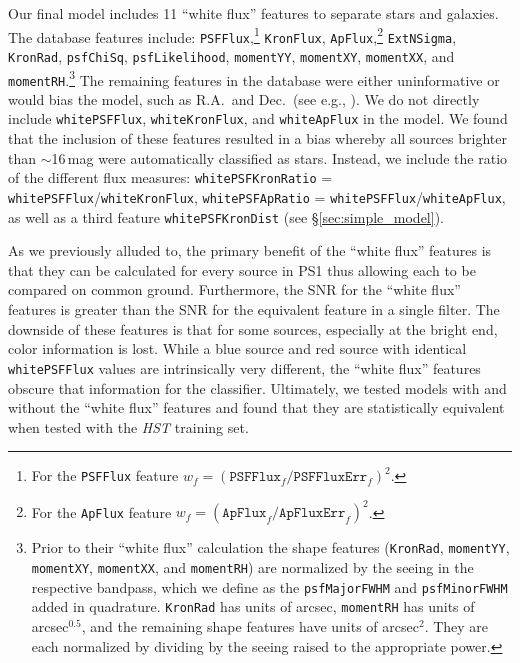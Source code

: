\documentclass[twocolumn]{aastex62}
\begin{document}
Our final model includes 11 ``white flux'' features to separate stars and
galaxies. The database features include: \texttt{PSFFlux},\footnote{For the
\texttt{PSFFlux} feature $w_f =
(\mathtt{PSFFlux}_f/\mathtt{PSFFluxErr}_f)^2$.} \texttt{KronFlux},
\texttt{ApFlux},\footnote{For the \texttt{ApFlux} feature $w_f =
(\mathtt{ApFlux}_f/\mathtt{ApFluxErr}_f)^2$.} \texttt{ExtNSigma},
\texttt{KronRad}, \texttt{psfChiSq}, \texttt{psfLikelihood},
\texttt{momentYY}, \texttt{momentXY}, \texttt{momentXX}, and
\texttt{momentRH}.\footnote{Prior to their ``white flux'' calculation the
shape features (\texttt{KronRad}, \texttt{momentYY}, \texttt{momentXY},
\texttt{momentXX}, and \texttt{momentRH}) are normalized by the seeing in the
respective bandpass, which we define as the \texttt{psfMajorFWHM} and
\texttt{psfMinorFWHM} added in quadrature. \texttt{KronRad} has units of
arcsec, \texttt{momentRH} has units of arcsec$^{0.5}$, and the remaining
shape features have units of arcsec$^{2}$. They are each normalized by
dividing by the seeing raised to the appropriate power. } The remaining
features in the database were either uninformative or would bias the model,
such as R.A.\ and Dec.\ (see e.g., \citealt{Richards12a}). We do not directly
include \texttt{whitePSFFlux}, \texttt{whiteKronFlux}, and
\texttt{whiteApFlux} in the model. We found that the inclusion of these
features resulted in a bias whereby all sources brighter than $\sim$16\,mag
were automatically classified as stars. Instead, we include the ratio of the
different flux measures: \texttt{whitePSFKronRatio} =
\texttt{whitePSFFlux}/\texttt{whiteKronFlux}, \texttt{whitePSFApRatio} =
\texttt{whitePSFFlux}/\texttt{whiteApFlux}, as well as a third feature
\texttt{whitePSFKronDist} (see \S\ref{sec:simple_model}).

As we previously alluded to, the primary benefit of the ``white flux''
features is that they can be calculated for every source in PS1 thus allowing
each to be compared on common ground. Furthermore, the SNR for the ``white
flux'' features is greater than the SNR for the equivalent feature in a
single filter. The downside of these features is that for some sources,
especially at the bright end, color information is lost. While a blue source
and red source with identical \texttt{whitePSFFlux} values are intrinsically
very different, the ``white flux'' features obscure that information for the
classifier. Ultimately, we tested models with and without the ``white flux''
features and found that they are statistically equivalent when tested with
the \textit{HST} training set.
\end{document}
